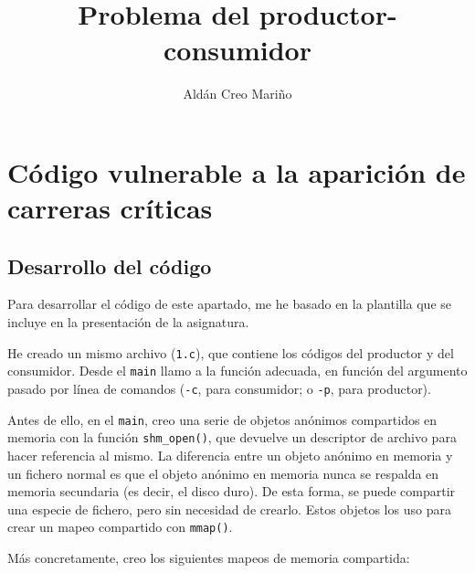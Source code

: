 \documentclass[a4paper]{article}
\title{Problema del productor-consumidor}
\author{Aldán Creo Mariño}
\begin{document}
\maketitle

\section{Código vulnerable a la aparición de carreras críticas} \label{apartado_1}

\subsection{Desarrollo del código}

Para desarrollar el código de este apartado, me he basado en la plantilla que se incluye en la presentación de la asignatura.

He creado un mismo archivo (\texttt{1.c}), que contiene los códigos del productor y del consumidor. Desde el \texttt{main} llamo a la función adecuada, en función del argumento pasado por línea de comandos (\texttt{-c}, para consumidor; o \texttt{-p}, para productor).

Antes de ello, en el \texttt{main}, creo una serie de objetos anónimos compartidos en memoria con la función \texttt{shm\_open()}, que devuelve un descriptor de archivo para hacer referencia al mismo. La diferencia entre un objeto anónimo en memoria y un fichero normal es que el objeto anónimo en memoria nunca se respalda en memoria secundaria (es decir, el disco duro). De esta forma, se puede compartir una especie de fichero, pero sin necesidad de crearlo. Estos objetos los uso para crear un mapeo compartido con \texttt{mmap()}.

Más concretamente, creo los siguientes mapeos de memoria compartida:
\end{document}
